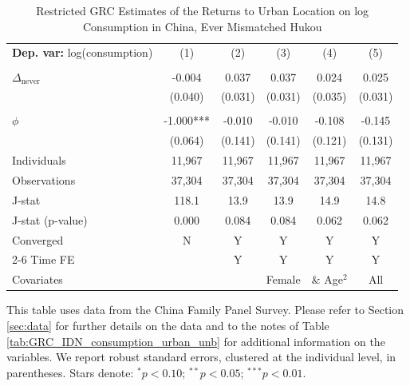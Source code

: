 \begin{table}[htbp] \centering \begin{threeparttable}
 \caption{Restricted GRC Estimates of the Returns to Urban Location on log Consumption in China, Ever Mismatched Hukou} 
 \label{tab:GRC_CHN_mis_consumption_urban_unb} 
\begin{tabular}{l ccccc} \toprule  \textbf{Dep. var:}  log(consumption) 
                    &\multicolumn{1}{c}{(1)}   &\multicolumn{1}{c}{(2)}   &\multicolumn{1}{c}{(3)}   &\multicolumn{1}{c}{(4)}   &\multicolumn{1}{c}{(5)}   \\
                    &               &               &               &               &               \\
\addlinespace
$\Delta_{\text{never}}$&      -0.004   &       0.037   &       0.037   &       0.024   &       0.025   \\
                    &     (0.040)   &     (0.031)   &     (0.031)   &     (0.035)   &     (0.031)   \\
                    &               &               &               &               &               \\
\addlinespace
$\phi$              &      -1.000***&      -0.010   &      -0.010   &      -0.108   &      -0.145   \\
                    &     (0.064)   &     (0.141)   &     (0.141)   &     (0.121)   &     (0.131)   \\
\addlinespace
Individuals         &      11,967   &      11,967   &      11,967   &      11,967   &      11,967   \\
Observations        &      37,304   &      37,304   &      37,304   &      37,304   &      37,304   \\
J-stat              &       118.1   &        13.9   &        13.9   &        14.9   &        14.8   \\
J-stat (p-value)    &       0.000   &       0.084   &       0.084   &       0.062   &       0.062   \\
Converged           &           N   &           Y   &           Y   &           Y   &           Y   \\
\cmidrule{2-6} Time FE & & Y & Y & Y & Y \\ Covariates & & & Female & \& Age$^2$ & All \\ \bottomrule \end{tabular} \begin{tablenotes}[flushleft] \footnotesize \item{This table uses data from the China Family Panel Survey. Please refer to Section \ref{sec:data} for further details on the data and to the notes of Table \ref{tab:GRC_IDN_consumption_urban_unb} for additional information on the variables. We report robust standard errors, clustered at the individual level, in parentheses. Stars denote: $^{*} p<0.10$; $^{**} p<0.05$; $^{***} p<0.01$.} \end{tablenotes} \end{threeparttable} \end{table}
